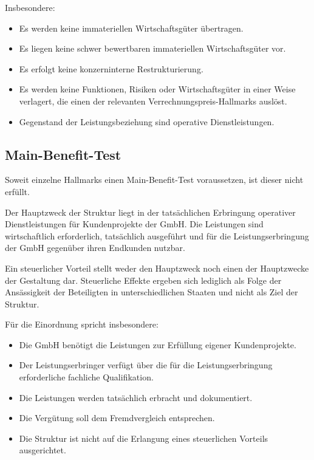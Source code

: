 \documentclass[11pt,a4paper]{article}
\begin{document}
Insbesondere:

\begin{itemize}
    \item Es werden keine immateriellen Wirtschaftsgüter übertragen.
    \item Es liegen keine schwer bewertbaren immateriellen Wirtschaftsgüter vor.
    \item Es erfolgt keine konzerninterne Restrukturierung.
    \item Es werden keine Funktionen, Risiken oder Wirtschaftsgüter in einer Weise verlagert, die einen der relevanten Verrechnungspreis-Hallmarks auslöst.
    \item Gegenstand der Leistungsbeziehung sind operative Dienstleistungen.
\end{itemize}

\subsection{Main-Benefit-Test}

Soweit einzelne Hallmarks einen Main-Benefit-Test voraussetzen, ist dieser nicht erfüllt.

Der Hauptzweck der Struktur liegt in der tatsächlichen Erbringung operativer Dienstleistungen für Kundenprojekte der GmbH. Die Leistungen sind wirtschaftlich erforderlich, tatsächlich ausgeführt und für die Leistungserbringung der GmbH gegenüber ihren Endkunden nutzbar.

Ein steuerlicher Vorteil stellt weder den Hauptzweck noch einen der Hauptzwecke der Gestaltung dar. Steuerliche Effekte ergeben sich lediglich als Folge der Ansässigkeit der Beteiligten in unterschiedlichen Staaten und nicht als Ziel der Struktur.

Für die Einordnung spricht insbesondere:

\begin{itemize}
    \item Die GmbH benötigt die Leistungen zur Erfüllung eigener Kundenprojekte.
    \item Der Leistungserbringer verfügt über die für die Leistungserbringung erforderliche fachliche Qualifikation.
    \item Die Leistungen werden tatsächlich erbracht und dokumentiert.
    \item Die Vergütung soll dem Fremdvergleich entsprechen.
    \item Die Struktur ist nicht auf die Erlangung eines steuerlichen Vorteils ausgerichtet.
\end{itemize}
\end{document}
